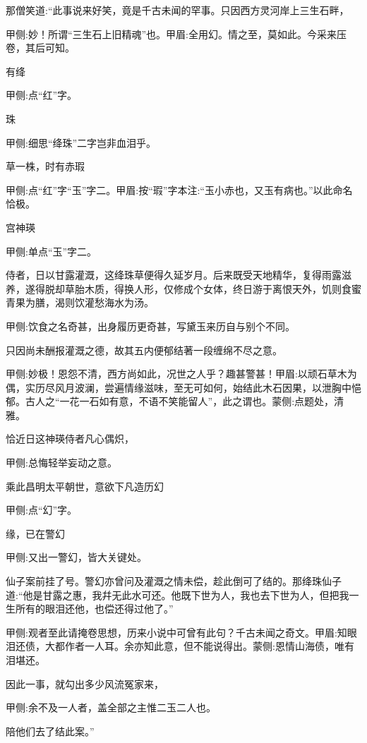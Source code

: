 \begin{parag}
    那僧笑道:“此事说来好笑，竟是千古未闻的罕事。只因西方灵河岸上三生石畔，\begin{note}甲侧:妙！所谓“三生石上旧精魂”也。甲眉:全用幻。情之至，莫如此。今采来压卷，其后可知。\end{note}有绛\begin{note}甲侧:点“红”字。\end{note}珠\begin{note}甲侧:细思“绛珠”二字岂非血泪乎。\end{note}草一株，时有赤瑕\begin{note}甲侧:点“红”字“玉”字二。甲眉:按“瑕”字本注:“玉小赤也，又玉有病也。”以此命名恰极。\end{note}宫神瑛\begin{note}甲侧:单点“玉”字二。\end{note}侍者，日以甘露灌溉，这绛珠草便得久延岁月。后来既受天地精华，复得雨露滋养，遂得脱却草胎木质，得换人形，仅修成个女体，终日游于离恨天外，饥则食蜜青果为膳，渴则饮灌愁海水为汤。\begin{note}甲侧:饮食之名奇甚，出身履历更奇甚，写黛玉来历自与别个不同。\end{note}只因尚未酬报灌溉之德，故其五内便郁结著一段缠绵不尽之意。\begin{note}甲侧:妙极！恩怨不清，西方尚如此，况世之人乎？趣甚警甚！甲眉:以顽石草木为偶，实历尽风月波澜，尝遍情缘滋味，至无可如何，始结此木石因果，以泄胸中悒郁。古人之“一花一石如有意，不语不笑能留人”，此之谓也。蒙侧:点题处，清雅。\end{note}恰近日这神瑛侍者凡心偶炽，\begin{note}甲侧:总悔轻举妄动之意。\end{note}乘此昌明太平朝世，意欲下凡造历幻\begin{note}甲侧:点“幻”字。\end{note}缘，已在警幻\begin{note}甲侧:又出一警幻，皆大关键处。\end{note}仙子案前挂了号。警幻亦曾问及灌溉之情未偿，趁此倒可了结的。那绛珠仙子道:“他是甘露之惠，我幷无此水可还。他既下世为人，我也去下世为人，但把我一生所有的眼泪还他，也偿还得过他了。”\begin{note}甲侧:观者至此请掩卷思想，历来小说中可曾有此句？千古未闻之奇文。甲眉:知眼泪还债，大都作者一人耳。余亦知此意，但不能说得出。蒙侧:恩情山海债，唯有泪堪还。\end{note}因此一事，就勾出多少风流冤家来，\begin{note}甲侧:余不及一人者，盖全部之主惟二玉二人也。\end{note}陪他们去了结此案。”
\end{parag}


